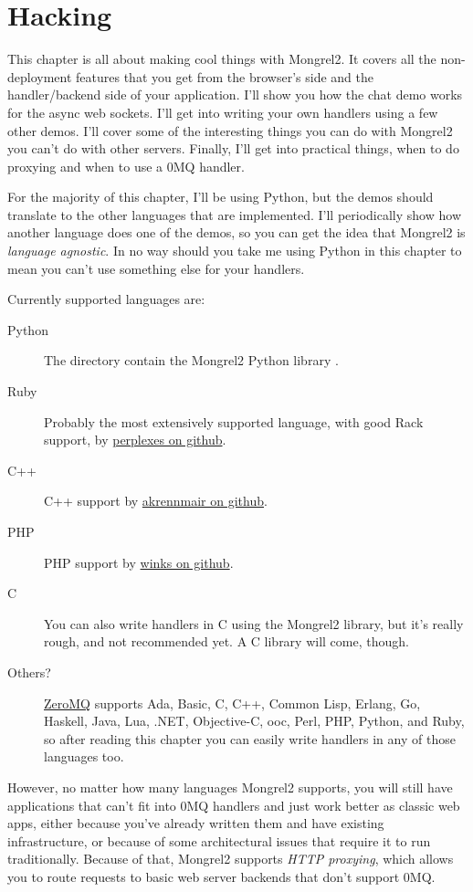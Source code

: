 \chapter{Hacking}

This chapter is all about making cool things with Mongrel2.  It covers all the non-deployment
features that you get from the browser's side and the handler/backend side of your application.
I'll show you how the chat demo works for the async web sockets.  I'll get into writing your
own handlers using a few other demos.  I'll cover some of the interesting things you can
do with Mongrel2 you can't do with other servers.  Finally, I'll get into practical things,
when to do proxying and when to use a 0MQ handler.

For the majority of this chapter, I'll be using Python, but the demos should translate to
the other languages that are implemented.  I'll periodically show how another language
does one of the demos, so you can get the idea that Mongrel2 is \emph{language agnostic}.
In no way should you take me using Python in this chapter to mean you can't use something
else for your handlers.

Currently supported languages are:

\begin{description}
\item [Python] The directory  contain the Mongrel2 Python library .
\item [Ruby] Probably the most extensively supported language, with good Rack support, by \href{http://github.com/perplexes/m2r}{perplexes on github}.
\item [C++] C++ support by \href{http://github.com/akrennmair/mongrel2-cpp}{akrennmair on github}.
\item [PHP] PHP support by \href{http://github.com/winks/m2php}{winks on github}.
\item [C] You can also write handlers in C using the Mongrel2 library, but it's really rough, and not recommended yet.  A C library will come, though.
\item [Others?] \href{http://zeromq.org}{ZeroMQ} supports Ada, Basic, C, C++, Common Lisp, Erlang, Go, Haskell, Java, Lua, .NET, Objective-C, ooc, Perl, PHP, Python, and Ruby, so after reading this chapter you can easily write handlers in any of those languages too.
\end{description}

However, no matter how many languages Mongrel2 supports, you will still have applications that
can't fit into 0MQ handlers and just work better as classic web apps, either because you've
already written them and have existing infrastructure, or because of some architectural issues
that require it to run traditionally.  Because of that, Mongrel2 supports \emph{HTTP proxying},
which allows you to route requests to basic web server backends that don't support 0MQ.

